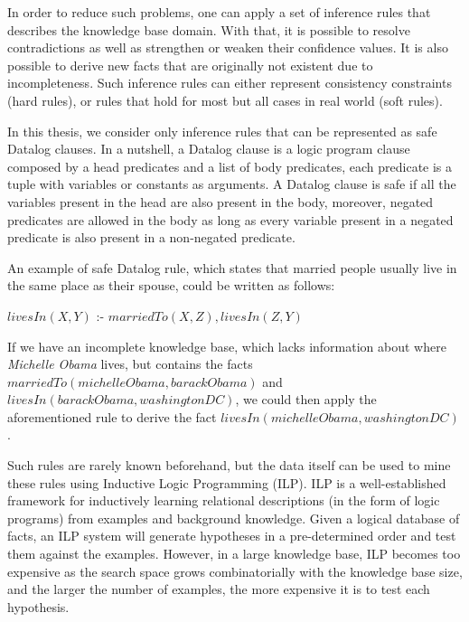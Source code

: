 
In order to reduce such problems, one can apply a set of inference rules that describes the knowledge base domain.
With that, it is possible to resolve contradictions as well as strengthen or weaken their confidence values. It is
also possible to derive new facts that are originally not existent due to incompleteness. Such inference rules can
either represent consistency constraints (hard rules), or rules that hold for most but all cases in real world (soft
rules).

In this thesis, we consider only inference rules that can be represented as safe Datalog clauses. In a nutshell,
a Datalog clause is a logic program clause composed by a head predicates and a list of body predicates, each
predicate is a tuple with variables or constants as arguments. A Datalog clause is safe if all the variables present
in the head are also present in the body, moreover, negated predicates are allowed in the body as long as every
variable present in a negated predicate is also present in a non-negated predicate.

An example of safe Datalog rule, which states that married people usually live in the same place as their spouse,
could be written as follows:

\begin{center}
  $livesIn(X,Y)$ :- $marriedTo(X,Z),livesIn(Z,Y)$
\end{center}

If we have an incomplete knowledge base, which lacks information about where \emph{Michelle Obama} lives, but
contains the facts $marriedTo(michelleObama,barackObama)$ and $livesIn(barackObama,washingtonDC)$, we could then
apply the aforementioned rule to derive the fact $livesIn(michelleObama, washingtonDC)$. 



Such rules are rarely known beforehand, but the data itself can be used to mine these rules using Inductive Logic
Programming (ILP). ILP is a well-established framework for inductively learning relational descriptions (in the form
of logic programs) from examples and background knowledge. Given a logical database of facts, an ILP system will
generate hypotheses in a pre-determined order and test them against the examples. However, in a large knowledge base,
ILP becomes too expensive as the search space grows combinatorially with the knowledge base size, and the larger the
number of examples, the more expensive it is to test each hypothesis.

